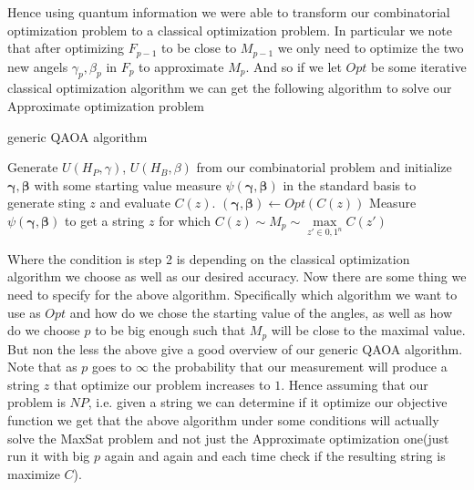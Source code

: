 \documentclass[12pt]{amsart}
\numberwithin{equation}{section}
\theoremstyle{definition}
\begin{document}
Hence using quantum information we were able to transform our combinatorial optimization problem to a classical optimization problem. In particular we note that after optimizing $F_{p-1}$ to be close to $M_{p-1}$ we only need to optimize the two new angels $\gamma_p,\beta_p$ in $F_p$ to approximate $M_p$. And so if we let $Opt$ be some iterative classical optimization algorithm we can get the following algorithm to solve our Approximate optimization problem
\[\]\[\]
\begin{algorithm}[hbt!]
\caption{generic QAOA algorithm}\label{alg:cap}
\begin{algorithmic}[1]
\State Generate $U(H_P,\gamma)$, $U(H_B,\beta)$ from our  combinatorial problem and initialize $\pmb{\gamma},\pmb{\beta}$ with some starting value
\State measure $\psi(\pmb{\gamma},\pmb{\beta})$ in the standard basis to generate sting $z$ and evaluate $C(z)$.
\State $(\pmb{\gamma},\pmb{\beta})\gets Opt(C(z))$
\EndWhile
\State Measure $\psi(\pmb{\gamma},\pmb{\beta})$ to get a string $z$ for which $C(z)\sim M_p\sim \max\limits_{z'\in{0,1}^n}C(z')$
\State {}
\end{algorithmic}
\end{algorithm}
Where the condition is step 2 is depending on the classical optimization algorithm we choose as well as our desired accuracy.
Now there are some thing we need to specify for the above algorithm. Specifically which algorithm we want to use as $Opt$ and how do we chose the starting value of the angles, as well as how do we choose $p$ to be big enough such that $M_p$ will be close to the maximal value. But non the less the above give a good overview of our generic QAOA algorithm. Note that as $p$ goes to $\infty$ the probability that our measurement will produce a string $z$ that optimize our problem increases to $1$. Hence assuming that our problem is $NP$, i.e. given a string we can determine if it optimize our objective function we get that the above algorithm under some conditions will actually solve the MaxSat problem and not just the Approximate optimization one(just run it with big $p$ again and again and each time check if the resulting string is maximize $C$).  
\end{document}
